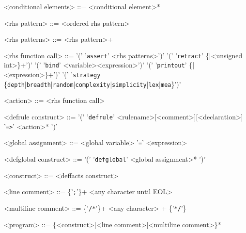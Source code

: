 \begin{grammar}
{<conditional elements> ::= <conditional element>*

<rhs pattern> ::= <ordered rhs pattern>

<rhs patterns> ::= <rhs pattern>+

<rhs function call> ::= '(' '\verb!assert!' <rhs patterns>')'
\alt '(' '\verb!retract!' \{<singlefield variable>|<unsigned int>\}+')'
\alt '(' '\verb!bind!' <variable><expression>')'
\alt '(' '\verb!printout!' \{<prinout string>|<expression>\}+')'
\alt '(' '\verb!strategy! \{\verb!depth!|\verb!breadth!|\verb!random!|\verb!complexity!|\verb!simplicity!|\verb!lex!|\verb!mea!\}')'


<action> ::= <rhs function call>

<defrule construct> ::= '(' '\verb!defrule!' <rulename>[<comment>][<declaration>]\\<conditional elements> '\verb!=>!' <action>* ')'

<global assignment> ::= <global variable> '\verb!=!' <expression>

<defglobal construct> ::= '(' '\verb!defglobal!' <global assignment>* ')'

<construct> ::= <deffacts construct>

<line comment> ::= \{'\verb!;!'\}+ <any character until EOL>

<multiline comment> ::= \{'\verb!/*!'\}+ <any character>  + \{'\verb!*/!'\}

<program> ::= \{<construct>|<line comment>|<multiline comment>\}*
}
\end{grammar}

